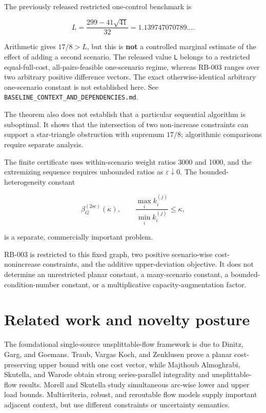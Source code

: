 \documentclass[
  11pt,
]{article}
\begin{document}
The previously released restricted one-control benchmark is

\[
L=\frac{299-41\sqrt{41}}{32}
=1.139747070789\ldots.
\]

Arithmetic gives \(17/8>L\), but this is \textbf{not} a controlled
marginal estimate of the effect of adding a second scenario. The
released value \texttt{L} belongs to a restricted equal-full-cost,
all-pairs-feasible one-scenario regime, whereas RB-003 ranges over two
arbitrary positive difference vectors. The exact otherwise-identical
arbitrary one-scenario constant is not established here. See
\texttt{BASELINE\_CONTEXT\_AND\_DEPENDENCIES.md}.

The theorem also does not establish that a particular sequential
algorithm is suboptimal. It shows that the intersection of two
non-increase constraints can support a star-triangle obstruction with
supremum \(17/8\); algorithmic comparisons require separate analysis.

The finite certificate uses within-scenario weight ratios 3000 and 1000,
and the extremizing sequence requires unbounded ratios as
\(\varepsilon\downarrow0\). The bounded-heterogeneity constant

\[
\beta_G^{(2\mathrm{sc})}(\kappa),
\qquad
\frac{\max_i k_i^{(j)}}{\min_i k_i^{(j)}}\le\kappa,
\]

is a separate, commercially important problem.

RB-003 is restricted to this fixed graph, two positive scenario-wise
cost-nonincrease constraints, and the additive upper-deviation
objective. It does not determine an unrestricted planar constant, a
many-scenario constant, a bounded-condition-number constant, or a
multiplicative capacity-augmentation factor.

\section{Related work and novelty
posture}\label{related-work-and-novelty-posture}

The foundational single-source unsplittable-flow framework is due to
Dinitz, Garg, and Goemans. Traub, Vargas Koch, and Zenklusen prove a
planar cost-preserving upper bound with one cost vector, while Majthoub
Almoghrabi, Skutella, and Warode obtain strong series-parallel
integrality and unsplittable-flow results. Morell and Skutella study
simultaneous arc-wise lower and upper load bounds. Multicriteria,
robust, and reroutable flow models supply important adjacent context,
but use different constraints or uncertainty semantics.
\end{document}

